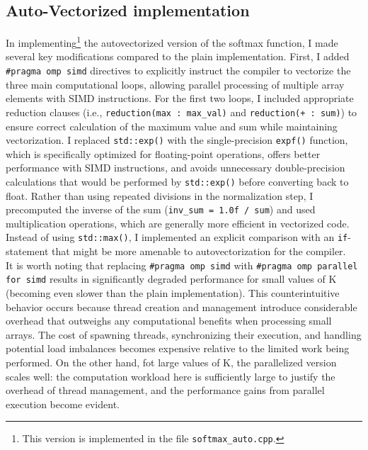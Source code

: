 \documentclass[10pt]{article}
\begin{document}
\subsection{Auto-Vectorized implementation}
In implementing\footnote{This version is implemented in the file \texttt{softmax\_auto.cpp}.} the autovectorized version of the softmax function, I made several key modifications compared to the plain implementation. First, I added \texttt{\#pragma omp simd} directives to explicitly instruct the compiler to vectorize the three main computational loops, allowing parallel processing of multiple array elements with SIMD instructions. For the first two loops, I included appropriate reduction clauses (i.e., \texttt{reduction(max : max\_val)} and \texttt{reduction(+ : sum)}) to ensure correct calculation of the maximum value and sum while maintaining vectorization. I replaced \texttt{std::exp()} with the single-precision \texttt{expf()} function, which is specifically optimized for floating-point operations, offers better performance with SIMD instructions, and avoids unnecessary double-precision calculations that would be performed by \texttt{std::exp()} before converting back to float. Rather than using repeated divisions in the normalization step, I precomputed the inverse of the sum (\texttt{inv\_sum = 1.0f / sum}) and used multiplication operations, which are generally more efficient in vectorized code. Instead of using \texttt{std::max()}, I implemented an explicit comparison with an \texttt{if}-statement that might be more amenable to autovectorization for the compiler. \\

It is worth noting that replacing \texttt{\#pragma omp simd} with \texttt{\#pragma omp parallel for simd} results in significantly degraded performance for small values of K (becoming even slower than the plain implementation). This counterintuitive behavior occurs because thread creation and management introduce considerable overhead that outweighs any computational benefits when processing small arrays. The cost of spawning threads, synchronizing their execution, and handling potential load imbalances becomes expensive relative to the limited work being performed. On the other hand, fot large values of K, the parallelized version scales well: the computation workload here is sufficiently large to justify the overhead of thread management, and the performance gains from parallel execution become evident.
\end{document}
